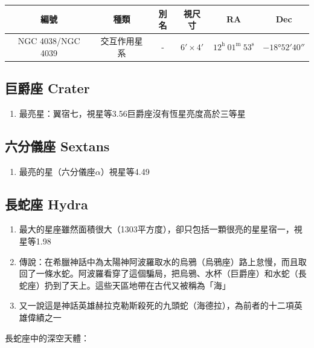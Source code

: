 \begin{center}
\begin{longtable}{c | c | c | c | c | c}
    編號 & 種類 & 別名 & 視尺寸 & RA & Dec \\
    \hline
    \endfirsthead


    \endfoot

    \endlastfoot

    NGC 4038/NGC 4039 & 交互作用星系 & - & \(\ang{;6;}\times\ang{;4;}\) & \(12^\text{h }01^\text{m }53^\text{s}\) & \(-\ang{18;52;40}\) \\
\end{longtable}
\end{center}

\subsection{巨爵座 Crater}
\begin{enumerate}
    \item 最亮星：翼宿七，視星等3.56巨爵座沒有恆星亮度高於三等星
\end{enumerate}

\subsection{六分儀座 Sextans}
\begin{enumerate}
    \item 最亮的星（六分儀座\(\alpha\)）視星等4.49
\end{enumerate}

\subsection{長蛇座 Hydra}
\begin{enumerate}
    \item 最大的星座雖然面積很大（1303平方度），卻只包括一顆很亮的星星宿一，視星等1.98
    \item 傳說：在希臘神話中為太陽神阿波羅取水的烏鴉（烏鴉座）路上怠慢，而且取回了一條水蛇。阿波羅看穿了這個騙局，把烏鴉、水杯（巨爵座）和水蛇（長蛇座）扔到了天上。這些天區地帶在古代又被稱為「海」
    \item 又一說這是神話英雄赫拉克勒斯殺死的九頭蛇（海德拉），為前者的十二項英雄偉績之一
\end{enumerate}
長蛇座中的深空天體：

